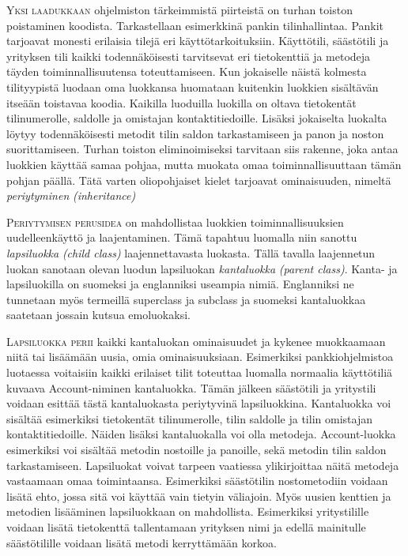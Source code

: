 \documentclass[openany]{book}
\newcommand{\newthought}[1]{\smallskip\textsc{#1}}
\newcommand{\eng}[1]{\textit{(#1)}}
\newcommand{\new}[1]{\textit{\gls{#1}}}
\newcommand{\neweng}[2]{\new{#1} \eng{#2}}
\begin{document}
\newthought{Yksi laadukkaan} ohjelmiston tärkeimmistä piirteistä on turhan toiston poistaminen
koodista. Tarkastellaan esimerkkinä pankin tilinhallintaa. Pankit tarjoavat monesti erilaisia
tilejä eri käyttötarkoituksiin. Käyttötili, säästötili ja yrityksen tili kaikki todennäköisesti
tarvitsevat eri tietokenttiä ja metodeja täyden toiminnallisuutensa toteuttamiseen. Kun jokaiselle
näistä kolmesta tilityypistä luodaan oma luokkansa huomataan kuitenkin luokkien sisältävän
itseään toistavaa koodia. Kaikilla luoduilla luokilla on oltava tietokentät tilinumerolle,
saldolle ja omistajan kontaktitiedoille. Lisäksi jokaiselta luokalta löytyy todennäköisesti
metodit tilin saldon tarkastamiseen ja panon ja noston suorittamiseen. Turhan toiston
eliminoimiseksi tarvitaan siis rakenne, joka antaa luokkien käyttää samaa pohjaa, mutta muokata
omaa toiminnallisuuttaan tämän pohjan päällä. Tätä varten oliopohjaiset kielet tarjoavat
ominaisuuden, nimeltä \neweng{periytyminen}{inheritance}

\newthought{Periytymisen perusidea} on mahdollistaa luokkien toiminnallisuuksien uudelleenkäyttö
ja laajentaminen. Tämä tapahtuu luomalla niin sanottu \neweng{lapsiluokka}{child class}
laajennettavasta luokasta. Tällä tavalla laajennetun luokan sanotaan olevan luodun lapsiluokan
\neweng{kantaluokka}{parent class}. Kanta- ja lapsiluokilla on suomeksi ja englanniksi useampia
nimiä. Englanniksi ne tunnetaan myös termeillä superclass ja subclass ja suomeksi kantaluokkaa
saatetaan jossain kutsua emoluokaksi.

\newthought{Lapsiluokka perii} kaikki kantaluokan ominaisuudet ja kykenee muokkaamaan niitä tai
lisäämään uusia, omia ominaisuuksiaan. Esimerkiksi pankkiohjelmistoa luotaessa voitaisiin kaikki
erilaiset tilit toteuttaa luomalla normaalia käyttötiliä kuvaava Account-niminen kantaluokka.
Tämän jälkeen säästötili ja yritystili voidaan esittää tästä kantaluokasta periytyvinä
lapsiluokkina. Kantaluokka voi sisältää esimerkiksi tietokentät tilinumerolle, tilin saldolle ja
tilin omistajan kontaktitiedoille. Näiden lisäksi kantaluokalla voi olla metodeja. Account-luokka
esimerkiksi voi sisältää metodin nostoille ja panoille, sekä metodin tilin saldon tarkastamiseen.
Lapsiluokat voivat tarpeen vaatiessa ylikirjoittaa näitä metodeja vastaamaan omaa toimintaansa.
Esimerkiksi säästötilin nostometodiin voidaan lisätä ehto, jossa sitä voi käyttää vain tietyin
väliajoin. Myös uusien kenttien ja metodien lisääminen lapsiluokkaan on mahdollista. Esimerkiksi
yritystilille voidaan lisätä tietokenttä tallentamaan yrityksen nimi ja edellä mainitulle
säästötilille voidaan lisätä metodi kerryttämään korkoa.
\end{document}
